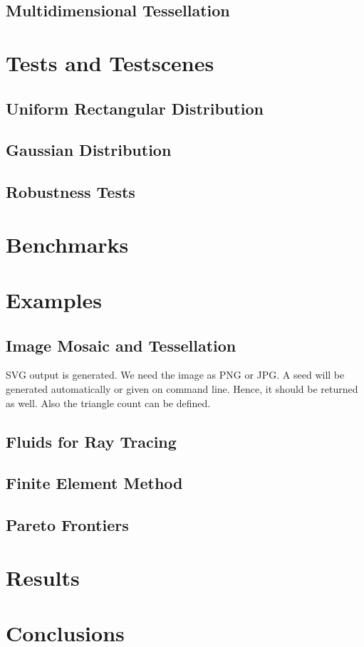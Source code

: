 \documentclass[10pt, twoside, fleqn]{article}
\let\oldsection\section
\renewcommand*\section{%
  \cleardoublepage
  \thispagestyle{sectionstyle}\oldsection}
\begin{document}
    \subsection{Multidimensional Tessellation}
  \section{Tests and Testscenes}
    \subsection{Uniform Rectangular Distribution}
    \subsection{Gaussian Distribution}
    \subsection{Robustness Tests}
  \section{Benchmarks}
  \section{Examples}
    \subsection{Image Mosaic and Tessellation}
      SVG output is generated.
      We need the image as PNG or JPG.
      A seed will be generated automatically or given on command line.
      Hence, it should be returned as well.
      Also the triangle count can be defined.
    \subsection{Fluids for Ray Tracing}
    \subsection{Finite Element Method}
    \subsection{Pareto Frontiers}
  \section{Results}
  \section{Conclusions}

  \nocite{*}
  \printbibliography[heading=bibintoc]
\end{document}
